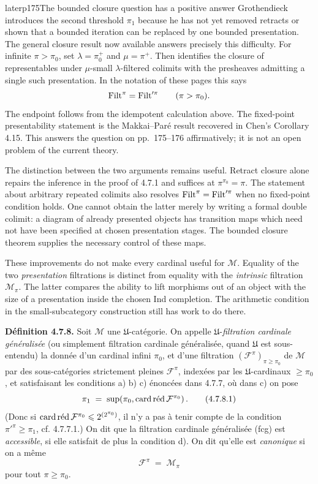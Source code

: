 \begin{dcomment}{later}{p175}{The bounded closure question has a positive answer}
Grothendieck introduces the second threshold $\pi_1$ because he has not yet removed retracts or shown that a bounded iteration can be replaced by one bounded presentation. The general closure result now available answers precisely this difficulty. For infinite $\pi>\pi_0$, set $\lambda=\pi_0^+$ and $\mu=\pi^+$. Then \citet[Corollary 4.13]{Chen2021Sifted} identifies the closure of representables under $\mu$-small $\lambda$-filtered colimits with the presheaves admitting a single such presentation. In the notation of these pages this says
\[
 \Filt^\pi=\Filt'^\pi\qquad(\pi>\pi_0).
\]
The endpoint follows from the idempotent calculation above. The fixed-point presentability statement is the Makkai--Par\'e result recovered in Chen's Corollary 4.15. This answers the question on pp.~175--176 affirmatively; it is not an open problem of the current theory.

The distinction between the two arguments remains useful. Retract closure alone repairs the inference in the proof of 4.7.1 and suffices at $\pi^{\pi_0}=\pi$. The statement about arbitrary repeated colimits also resolves $\Filt^\pi=\Filt'^\pi$ when no fixed-point condition holds. One cannot obtain the latter merely by writing a formal double colimit: a diagram of already presented objects has transition maps which need not have been specified at chosen presentation stages. The bounded closure theorem supplies the necessary control of these maps.

These improvements do not make every cardinal useful for $\mathcal M$. Equality of the two \emph{presentation} filtrations is distinct from equality with the \emph{intrinsic} filtration $\mathcal M_\pi$. The latter compares the ability to lift morphisms out of an object with the size of a presentation inside the chosen Ind completion. The arithmetic condition in the small-subcategory construction still has work to do there.
\end{dcomment}


\textbf{Définition 4.7.8.} Soit $\mathcal{M}$ une $\mathfrak{U}$-catégorie. On appelle $\mathfrak{U}$-\textit{filtration cardinale généralisée} (ou simplement filtration cardinale généralisée, quand $\mathfrak{U}$ est sous-entendu) la donnée d'un cardinal infini $\pi_0$, et d'une filtration $(\mathcal{F}^{\pi})_{\pi\geqslant\pi_0}$ de $\mathcal{M}$ par des sous-catégories strictement pleines $\mathcal{F}^{\pi}$, indexées par les $\mathfrak{U}$-cardinaux $\geqslant\pi_0$, et satisfaisant les conditions a) b) c) énoncées dans 4.7.7, où dans c) on pose
\[
\pi_1 \;=\; \sup(\pi_0,\cardred\mathcal{F}^{\pi_0}) \, . \tag*{(4.7.8.1)}
\]
(Donc si $\cardred\mathcal{F}^{\pi_0}\leqslant 2^{(2^{\pi_0})}$, il n'y a pas à tenir compte de la condition $\pi'^{\pi}\geqslant\pi_1$, cf. 4.7.7.1.) On dit que la filtration cardinale généralisée (fcg) est \textit{accessible}, si elle satisfait de plus la condition d). On dit qu'elle est \textit{canonique} si on a même
\[
\mathcal{F}^{\pi} \;=\; \mathcal{M}_{\pi} \tag*{(4.7.8.2)}
\]
pour tout $\pi\geqslant\pi_0$.

